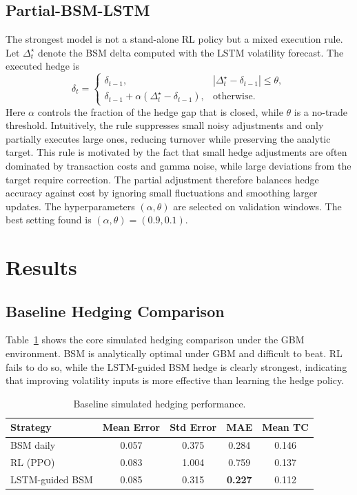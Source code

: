 \documentclass[10pt,a4paper]{article}
\begin{document}
\subsection*{Partial-BSM-LSTM}
The strongest model is not a stand-alone RL policy but a mixed execution rule.
Let $\Delta_t^\star$ denote the BSM delta computed with the LSTM volatility
forecast. The executed hedge is
\[
  \delta_t =
  \begin{cases}
    \delta_{t-1}, & |\Delta_t^\star - \delta_{t-1}| \le \theta, \\
    \delta_{t-1} + \alpha(\Delta_t^\star - \delta_{t-1}), & \text{otherwise}.
  \end{cases}
\]
Here $\alpha$ controls the fraction of the hedge gap that is closed, while
$\theta$ is a no-trade threshold. Intuitively, the rule suppresses small noisy
adjustments and only partially executes large ones, reducing turnover while
preserving the analytic target. This rule is motivated by the fact that small
hedge adjustments are often dominated by transaction costs and gamma noise,
while large deviations from the target require correction. The partial
adjustment therefore balances hedge accuracy against cost by ignoring small
fluctuations and smoothing larger updates. The hyperparameters $(\alpha,\theta)$ are
selected on validation windows. The best setting found is
$(\alpha,\theta)=(0.9,0.1)$.

\section{Results}
\subsection*{Baseline Hedging Comparison}
Table~\ref{tab:baseline} shows the core simulated hedging comparison under the
GBM environment. BSM is analytically optimal under GBM and difficult to beat.
RL fails to do so, while the LSTM-guided BSM hedge is clearly strongest,
indicating that improving volatility inputs is more effective than learning
the hedge policy.

\begin{table}[H]
\centering
\caption{Baseline simulated hedging performance.}
\label{tab:baseline}
\begin{tabular}{lcccc}
\toprule
Strategy & Mean Error & Std Error & MAE & Mean TC \\
\midrule
BSM daily            & 0.057 & 0.375 & 0.284 & 0.146 \\
RL (PPO)             & 0.083 & 1.004 & 0.759 & 0.137 \\
LSTM-guided BSM      & 0.085 & 0.315 & \textbf{0.227} & 0.112 \\
\bottomrule
\end{tabular}
\end{table}
\end{document}
